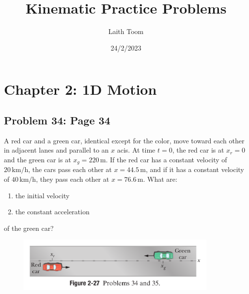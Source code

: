 \documentclass{article}
\title{Kinematic Practice Problems}
\author{Laith Toom}
\date{24/2/2023}
\begin{document}
\maketitle
\newpage
\tableofcontents
\newpage

\section{Chapter 2: 1D Motion}

    \subsection{Problem 34: Page 34}
    A red car and a green car, identical except for the 
    color, move toward each other in adjacent lanes and 
    parallel to an $x$ acis. At time $t=0$, the red car 
    is at $x_r=0$ and the green car is at $x_g=220\,\mathrm{m}$.
    If the red car has a constant velocity of $20\,\mathrm{km/h}$,
    the cars pass each other at $x=44.5\,\mathrm{m}$, and if it has 
    a constant velocity of $40\,\mathrm{km/h}$, they pass each other at
    $x=76.6\,\mathrm{m}$. What are:
    \begin{enumerate}[label=(\alph*)]
        \item the initial velocity 
        \item the constant acceleration
    \end{enumerate}
    of the green car?
    \begin{figure}[h!]
        \centering 
        \includegraphics[width=10cm]{Exam1Practice_Figures/fig34_34.png}
    \end{figure}
\end{document}
